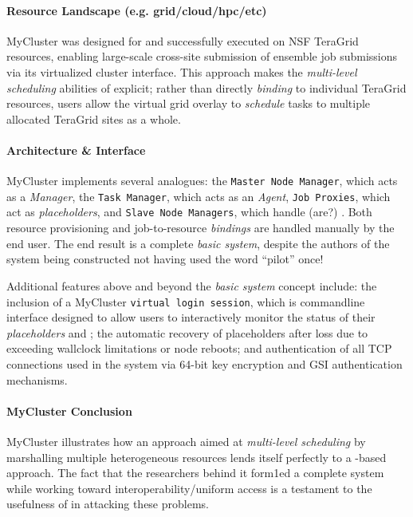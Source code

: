\documentclass{sig-alternate}
\begin{document}
\paragraph{Resource Landscape (e.g. grid/cloud/hpc/etc)}
MyCluster was designed for and successfully executed on NSF TeraGrid
resources, enabling large-scale cross-site submission of ensemble
job submissions via its virtualized cluster interface.  
This approach makes the \textit{multi-level scheduling} abilities
of \pilotjobs explicit; rather than directly \textit{binding}
to individual TeraGrid resources, users allow the virtual grid
overlay to \textit{schedule} tasks to multiple allocated TeraGrid sites
as a whole.

\paragraph{Architecture \& Interface}
MyCluster implements several \pilotjob analogues: the \texttt{Master
  Node Manager}, which acts as a \textit{\pilotjob Manager}, the
\texttt{Task Manager}, which acts as an \textit{\pilotjob Agent},
\texttt{Job Proxies}, which act as \textit{placeholders}, and
\texttt{Slave Node Managers}, which handle (are?) \textit{\pilotjob
  \cus}.  Both resource provisioning and job-to-resource \textit{bindings}
are handled manually by the end user.
The end result is a complete \textit{basic \pilotjob system}, despite the
authors of the system being constructed not having used the word ``pilot''
once!~\cite{1652061}  

Additional features above and beyond the \textit{basic \pilotjob system}
concept include: the inclusion of a MyCluster
\texttt{virtual login session}, which
is commandline interface designed to allow users to interactively
monitor the status of their \textit{placeholders} and \textit{\cus};
the automatic recovery of placeholders after loss due to exceeding wallclock
limitations or node reboots; and authentication of all TCP
connections used in the system via 64-bit key encryption and
GSI authentication mechanisms.

\paragraph{MyCluster Conclusion}
MyCluster illustrates how an approach aimed at \textit{multi-level
scheduling} by marshalling multiple heterogeneous resources lends
itself perfectly to a \pilotjob-based approach.  The fact that
the researchers behind it form1ed a complete \pilotjob system
while working toward interoperability/uniform access is a testament
to the usefulness of \pilotjobs in attacking these problems. 
\end{document}
